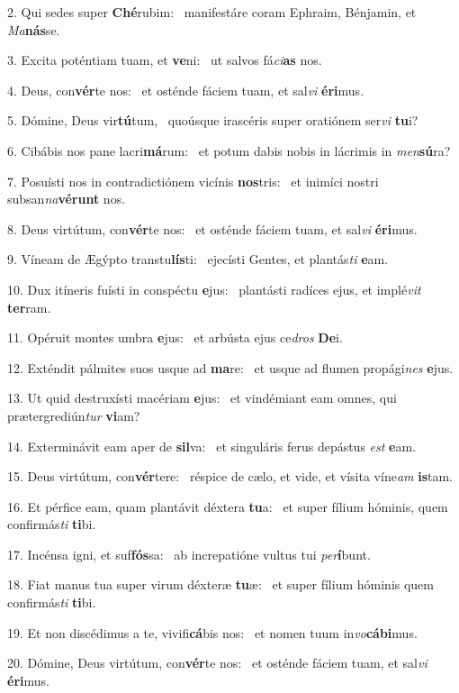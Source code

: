2. Qui sedes super \textbf{Ché}rubim: \ast\  manifestáre coram Ephraim, Bénjamin, et \textit{Ma}\textbf{nás}se.\

3. Excita poténtiam tuam, et \textbf{ve}ni: \ast\  ut salvos fá\textit{ci}\textbf{as} nos.\

4. Deus, con\textbf{vér}te nos: \ast\  et osténde fáciem tuam, et sal\textit{vi} \textbf{é}\textbf{ri}mus.\

5. Dómine, Deus vir\textbf{tú}tum, \ast\  quoúsque irascéris super oratiónem ser\textit{vi} \textbf{tu}i?\

6. Cibábis nos pane lacri\textbf{má}rum: \ast\  et potum dabis nobis in lácrimis in \textit{men}\textbf{sú}ra?\

7. Posuísti nos in contradictiónem vicínis \textbf{nos}tris: \ast\  et inimíci nostri subsan\textit{na}\textbf{vé}\textbf{runt} nos.\

8. Deus virtútum, con\textbf{vér}te nos: \ast\  et osténde fáciem tuam, et sal\textit{vi} \textbf{é}\textbf{ri}mus.\

9. Víneam de Ægýpto transtu\textbf{lís}ti: \ast\  ejecísti Gentes, et plantás\textit{ti} \textbf{e}am.\

10. Dux itíneris fuísti in conspéctu \textbf{e}jus: \ast\  plantásti radíces ejus, et implé\textit{vit} \textbf{ter}ram.\

11. Opéruit montes umbra \textbf{e}jus: \ast\  et arbústa ejus ce\textit{dros} \textbf{De}i.\

12. Exténdit pálmites suos usque ad \textbf{ma}re: \ast\  et usque ad flumen propági\textit{nes} \textbf{e}jus.\

13. Ut quid destruxísti macériam \textbf{e}jus: \ast\  et vindémiant eam omnes, qui prætergrediún\textit{tur} \textbf{vi}am?\

14. Exterminávit eam aper de \textbf{sil}va: \ast\  et singuláris ferus depástus \textit{est} \textbf{e}am.\

15. Deus virtútum, con\textbf{vér}tere: \ast\  réspice de cælo, et vide, et vísita víne\textit{am} \textbf{is}tam.\

16. Et pérfice eam, quam plantávit déxtera \textbf{tu}a: \ast\  et super fílium hóminis, quem confirmás\textit{ti} \textbf{ti}bi.\

17. Incénsa igni, et suf\textbf{fós}sa: \ast\  ab increpatióne vultus tui \textit{per}\textbf{í}bunt.\

18. Fiat manus tua super virum déxteræ \textbf{tu}æ: \ast\  et super fílium hóminis quem confirmás\textit{ti} \textbf{ti}bi.\

19. Et non discédimus a te, vivifi\textbf{cá}bis nos: \ast\  et nomen tuum in\textit{vo}\textbf{cá}\textbf{bi}mus.\

20. Dómine, Deus virtútum, con\textbf{vér}te nos: \ast\  et osténde fáciem tuam, et sal\textit{vi} \textbf{é}\textbf{ri}mus.\

